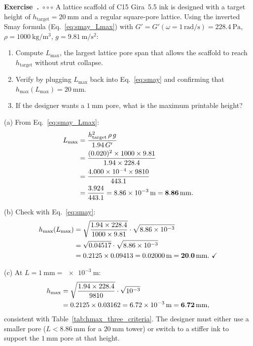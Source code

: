\documentclass[11pt,a4paper]{article}
\newcommand{\diffC}{\textcolor{red!70!black}{$\circ\circ\circ$}}
\newcounter{exidx}[section]
\renewcommand{\theexidx}{\thesection.\arabic{exidx}}
\newenvironment{exercise}[1]%
  {\par\smallskip\refstepcounter{exidx}%
   \noindent\textbf{Exercise~\theexidx}~#1\quad}
  {\par\smallskip}
\begin{document}
\begin{exercise}{\diffC}
A lattice scaffold of C15 Gira~5.5 ink is designed with a target
height of $h_\mathrm{target}=\SI{20}{\mm}$ and a regular square-pore
lattice.  Using the inverted Smay formula (Eq.~\eqref{eq:smay_Lmax})
with $G'=G'(\omega=1\,\si{\radian\per\s})=\SI{228.4}{\Pa}$,
$\rho=\SI{1000}{\kg\per\m^3}$, $g=\SI{9.81}{\m\per\s^2}$:
\begin{enumerate}[label=(\alph*),leftmargin=1.8em,itemsep=2pt]
\item Compute $L_\mathrm{max}$, the largest lattice pore span that allows
  the scaffold to reach $h_\mathrm{target}$ without strut collapse.
\item Verify by plugging $L_\mathrm{max}$ back into Eq.~\eqref{eq:smay}
  and confirming that $h_\mathrm{max}(L_\mathrm{max})=\SI{20}{\mm}$.
\item If the designer wants a $\SI{1}{\mm}$ pore, what is the maximum
  printable height?
\end{enumerate}
\end{exercise}
\begin{solution}
(a) From Eq.~\eqref{eq:smay_Lmax}:
\begin{align}
L_\mathrm{max}
&= \frac{h_\mathrm{target}^2\,\rho\,g}{1.94\,G'} \notag\\
&= \frac{(0.020)^2\times1000\times9.81}{1.94\times228.4} \notag\\
&= \frac{4.000\times10^{-4}\times9810}{443.1} \notag\\
&= \frac{3.924}{443.1}
= 8.86\times10^{-3}\,\si{\m}
= \mathbf{8.86\,\si{\mm}}.
\end{align}

(b) Check with Eq.~\eqref{eq:smay}:
\begin{align}
h_\mathrm{max}(L_\mathrm{max})
&= \sqrt{\frac{1.94\times228.4}{1000\times9.81}}\cdot\sqrt{8.86\times10^{-3}} \notag\\
&= \sqrt{0.04517}\cdot\sqrt{8.86\times10^{-3}} \notag\\
&= 0.2125\times0.09413
= 0.02000\,\si{\m}
= \mathbf{20.0\,\si{\mm}}.\ \checkmark
\end{align}

(c) At $L=\SI{1}{\mm}=\SI{e-3}{\m}$:
\begin{align}
h_\mathrm{max}
&= \sqrt{\frac{1.94\times228.4}{9810}}\cdot\sqrt{10^{-3}} \notag\\
&= 0.2125\times0.03162
= 6.72\times10^{-3}\,\si{\m}
= \mathbf{6.72\,\si{\mm}},
\end{align}
consistent with Table~\ref{tab:hmax_three_criteria}.  The designer must
either use a smaller pore ($L<\SI{8.86}{\mm}$ for a $\SI{20}{\mm}$
tower) or switch to a stiffer ink to support the $\SI{1}{\mm}$ pore at
that height.
\end{solution}
\end{document}
